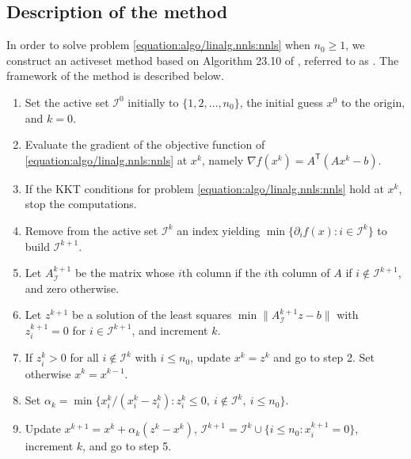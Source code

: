 \documentclass[letterpaper,10pt,english]{sphinxmanual}
\newcommand{\norm}[2][]{#1\lVert#2#1\rVert}
\newcommand{\set}[2][]{#1\{#2#1\}}
\def\T{\ensuremath{\mathsf{T}}}
\begin{document}
\subsection{Description of the method}
\label{\detokenize{algo/linalg.nnls:description-of-the-method}}
\sphinxAtStartPar
In order to solve problem \eqref{equation:algo/linalg.nnls:nnls} when \(n_0 \ge 1\), we construct an
active\sphinxhyphen{}set method based on Algorithm 23.10 of , referred to as .
The framework of the method is described below.
\begin{enumerate}
%
\item {} 
\sphinxAtStartPar
Set the active set \(\mathcal{I}^0\) initially to
\(\set{1, 2, \dots, n_0}\), the initial guess \(x^0\) to the
origin, and \(k = 0\).

\item {} 
\sphinxAtStartPar
Evaluate the gradient of the objective function of \eqref{equation:algo/linalg.nnls:nnls} at
\(x^k\), namely \(\nabla f(x^k) = A^{\T} (Ax^k - b)\).

\item {} 
\sphinxAtStartPar
If the KKT conditions for problem \eqref{equation:algo/linalg.nnls:nnls} hold at \(x^k\), stop the
computations.

\item {} 
\sphinxAtStartPar
Remove from the active set \(\mathcal{I}^k\) an index yielding
\(\min \set{\partial_i f(x) : i \in \mathcal{I}^k}\) to build
\(\mathcal{I}^{k + 1}\).

\item {} 
\sphinxAtStartPar
Let \(A_{\scriptscriptstyle\mathcal{I}}^{k + 1}\) be the matrix whose
\(i\)\sphinxhyphen{}th column if the \(i\)\sphinxhyphen{}th column of \(A\) if
\(i \notin \mathcal{I}^{k + 1}\), and zero otherwise.

\item {} 
\sphinxAtStartPar
Let \(z^{k + 1}\) be a solution of the least squares
\(\min \norm{A_{\scriptscriptstyle\mathcal{I}}^{k + 1} z - b}\) with
\(z_i^{k + 1} = 0\) for \(i \in \mathcal{I}^{k + 1}\), and increment
\(k\).

\item {} 
\sphinxAtStartPar
If \(z_i^k > 0\) for all \(i \notin \mathcal{I}^k\) with
\(i \le n_0\), update \(x^k = z^k\) and go to step 2. Set otherwise
\(x^k = x^{k - 1}\).

\item {} 
\sphinxAtStartPar
Set \(\alpha_k = \min \set{x_i^k / (x_i^k - z_i^k) : z_i^k \le 0, ~ i \notin \mathcal{I}^k, ~ i \le n_0}\).

\item {} 
\sphinxAtStartPar
Update \(x^{k + 1} = x^k + \alpha_k (z^k - x^k)\),
\(\mathcal{I}^{k + 1} = \mathcal{I}^k \cup \set{i \le n_0 : x_i^{k + 1} = 0}\),
increment \(k\), and go to step 5.

\end{enumerate}
\end{document}
